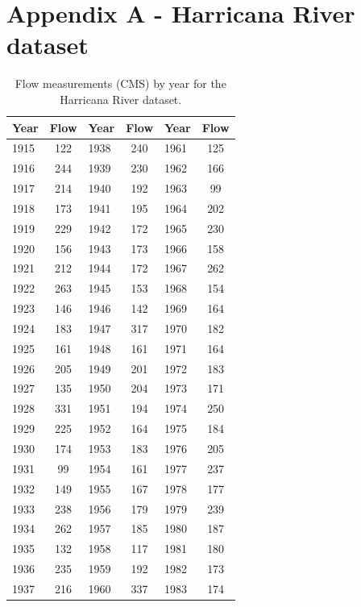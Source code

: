 \section*{Appendix A - Harricana River dataset}

\renewcommand{\arraystretch}{1.2}
\begin{table}[H]
\centering
\caption{Flow measurements (CMS) by year for the Harricana River dataset.}
\begin{tabular}{l c | l c | l c}
\hline
\textbf{Year} & \textbf{Flow} & \textbf{Year} & \textbf{Flow} & \textbf{Year} & \textbf{Flow} \\ \hline
1915 & 122   & 1938 & 240   & 1961 & 125   \\
1916 & 244   & 1939 & 230   & 1962 & 166   \\
1917 & 214   & 1940 & 192   & 1963 & 99  \\
1918 & 173   & 1941 & 195   & 1964 & 202   \\
1919 & 229   & 1942 & 172   & 1965 & 230   \\
1920 & 156   & 1943 & 173   & 1966 & 158   \\
1921 & 212   & 1944 & 172   & 1967 & 262   \\
1922 & 263   & 1945 & 153   & 1968 & 154   \\
1923 & 146   & 1946 & 142   & 1969 & 164   \\
1924 & 183   & 1947 & 317   & 1970 & 182   \\
1925 & 161   & 1948 & 161   & 1971 & 164   \\
1926 & 205   & 1949 & 201   & 1972 & 183   \\
1927 & 135   & 1950 & 204   & 1973 & 171   \\
1928 & 331   & 1951 & 194   & 1974 & 250   \\
1929 & 225   & 1952 & 164   & 1975 & 184   \\
1930 & 174   & 1953 & 183   & 1976 & 205   \\
1931 & 99  & 1954 & 161   & 1977 & 237   \\
1932 & 149   & 1955 & 167   & 1978 & 177   \\
1933 & 238   & 1956 & 179   & 1979 & 239   \\
1934 & 262   & 1957 & 185   & 1980 & 187   \\
1935 & 132   & 1958 & 117   & 1981 & 180   \\
1936 & 235   & 1959 & 192   & 1982 & 173   \\
1937 & 216   & 1960 & 337   & 1983 & 174   \\ \hline
\end{tabular}
\label{table:HRA_flows}
\end{table}


